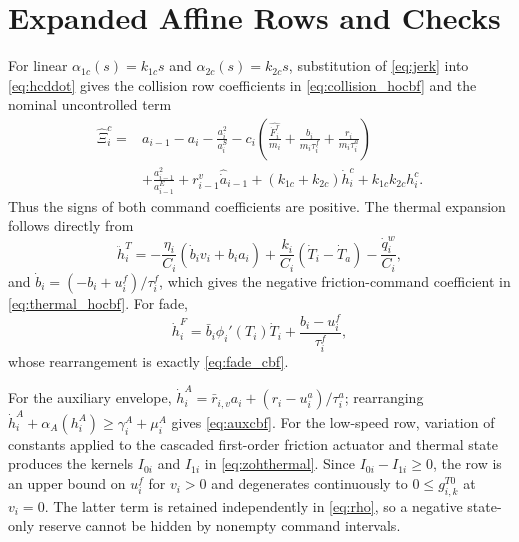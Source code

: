 \appendices
\section{Expanded Affine Rows and Checks}
For linear $\alpha_{1c}(s)=k_{1c}s$ and $\alpha_{2c}(s)=k_{2c}s$, substitution of \eqref{eq:jerk} into \eqref{eq:hcddot} gives the collision row coefficients in \eqref{eq:collision_hocbf} and the nominal uncontrolled term
\begin{align}
\widehat\Xi_i^c={}&a_{i-1}-a_i-\frac{a_i^2}{a_i^S}
-c_i\!\left(\frac{\widehat{\dot F_i^r}}{m_i}+\frac{b_i}{m_i\tau_i^f}+\frac{r_i}{m_i\tau_i^a}\right)\nonumber\\
&+\frac{a_{i-1}^2}{a_{i-1}^E}+r_{i-1}^v\widehat{\dot a}_{i-1}
+(k_{1c}+k_{2c})\dot h_i^c+k_{1c}k_{2c}h_i^c.
\end{align}
Thus the signs of both command coefficients are positive. The thermal expansion follows directly from
\begin{equation}
\ddot h_i^T=-\frac{\eta_i}{C_i}(\dot b_iv_i+b_ia_i)
+\frac{k_i}{C_i}(\dot T_i-\dot T_a)-\frac{\dot q_i^w}{C_i},
\end{equation}
and $\dot b_i=(-b_i+u_i^f)/\tau_i^f$, which gives the negative friction-command coefficient in \eqref{eq:thermal_hocbf}. For fade,
\begin{equation}
\dot h_i^F=\bar b_i\phi_i'(T_i)\dot T_i+\frac{b_i-u_i^f}{\tau_i^f},
\end{equation}
whose rearrangement is exactly \eqref{eq:fade_cbf}.

For the auxiliary envelope, $\dot h_i^A=\bar r_{i,v}a_i+(r_i-u_i^a)/\tau_i^a$; rearranging $\dot h_i^A+\alpha_A(h_i^A)\ge\gamma_i^A+\mu_i^A$ gives \eqref{eq:auxcbf}. For the low-speed row, variation of constants applied to the cascaded first-order friction actuator and thermal state produces the kernels $I_{0i}$ and $I_{1i}$ in \eqref{eq:zohthermal}. Since $I_{0i}-I_{1i}\ge0$, the row is an upper bound on $u_i^f$ for $v_i>0$ and degenerates continuously to $0\le g_{i,k}^{T0}$ at $v_i=0$. The latter term is retained independently in \eqref{eq:rho}, so a negative state-only reserve cannot be hidden by nonempty command intervals.

